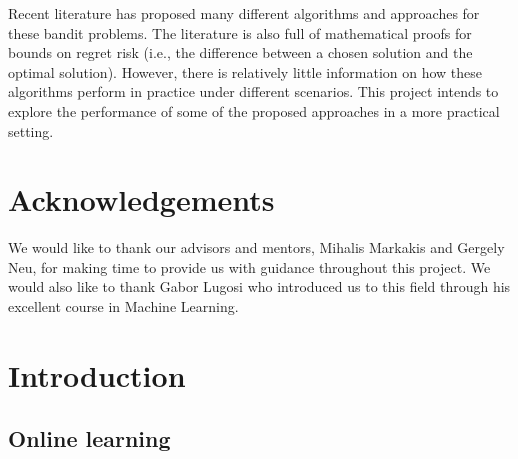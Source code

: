 Recent literature has proposed many different algorithms and approaches for these bandit problems. The literature is also full of mathematical proofs for bounds on regret risk (i.e., the difference between a chosen solution and the optimal solution). However, there is relatively little information on how these algorithms perform in practice under different scenarios. This project intends to explore the performance of some of the proposed approaches in a more practical setting.

\pagebreak

\vfill %


\section{Acknowledgements}
We would like to thank our advisors and mentors, Mihalis Markakis and Gergely Neu, for making time to provide us with guidance throughout this project. We would also like to thank Gabor Lugosi who introduced us to this field through his excellent course in Machine Learning.

\pagebreak


\tableofcontents %
\listoffigures
\listoftables

\pagebreak


\section{Introduction}

\subsection{Online learning}

